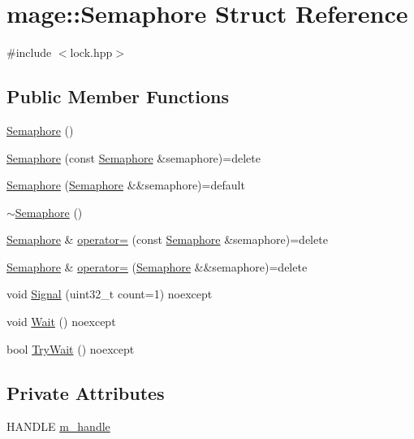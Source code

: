 \hypertarget{structmage_1_1_semaphore}{}\section{mage\+:\+:Semaphore Struct Reference}
\label{structmage_1_1_semaphore}


{\ttfamily \#include $<$lock.\+hpp$>$}

\subsection*{Public Member Functions}
\begin{DoxyCompactItemize}
\item 
\hyperlink{structmage_1_1_semaphore_a7b4f53c18b9a244ed98ef58fa5cfa2bb}{Semaphore} ()
\item 
\hyperlink{structmage_1_1_semaphore_a8873b2ed82ff66d323a8c3cebf0fb5c0}{Semaphore} (const \hyperlink{structmage_1_1_semaphore}{Semaphore} \&semaphore)=delete
\item 
\hyperlink{structmage_1_1_semaphore_a78484faaaff49a28c1f9ec7ad61f526f}{Semaphore} (\hyperlink{structmage_1_1_semaphore}{Semaphore} \&\&semaphore)=default
\item 
\hyperlink{structmage_1_1_semaphore_a991ed365c28e4a9c63ff34a5efeb012d}{$\sim$\+Semaphore} ()
\item 
\hyperlink{structmage_1_1_semaphore}{Semaphore} \& \hyperlink{structmage_1_1_semaphore_af3308cf7fa1ed33cda0ee53b9565f658}{operator=} (const \hyperlink{structmage_1_1_semaphore}{Semaphore} \&semaphore)=delete
\item 
\hyperlink{structmage_1_1_semaphore}{Semaphore} \& \hyperlink{structmage_1_1_semaphore_a7ce33136147e745f75d51abc77cd845c}{operator=} (\hyperlink{structmage_1_1_semaphore}{Semaphore} \&\&semaphore)=delete
\item 
void \hyperlink{structmage_1_1_semaphore_a41e6b5d60013ddcc8819927cad09b1c3}{Signal} (uint32\+\_\+t count=1) noexcept
\item 
void \hyperlink{structmage_1_1_semaphore_ab0be313e63792315ee9b227dea1184be}{Wait} () noexcept
\item 
bool \hyperlink{structmage_1_1_semaphore_a46d08edac69437678d05f354f10619de}{Try\+Wait} () noexcept
\end{DoxyCompactItemize}
\subsection*{Private Attributes}
\begin{DoxyCompactItemize}
\item 
H\+A\+N\+D\+LE \hyperlink{structmage_1_1_semaphore_ac1ded856984b4ac3739d9ff627838fda}{m\+\_\+handle}
\end{DoxyCompactItemize}


